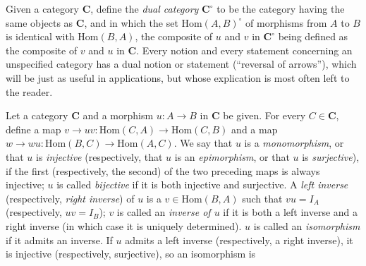 Given a category $\mathbf{C}$, define the \textit{dual category} $\mathbf{C}^{\circ}$ to be the
category having the same objects as $\mathbf{C}$, and in which the set
$\mathrm{Hom}(A,B)^{\circ}$ of morphisms from $A$ to $B$ is identical with
$\mathrm{Hom}(B,A)$, the composite of $u$ and $v$ in $\mathbf{C}^{\circ}$ being
defined as the composite of $v$ and $u$ in $\mathbf{C}$. Every notion and every
statement concerning an unspecified category has a dual notion or
statement (``reversal of arrows''), which will be just as useful in
applications, but whose explication is most often left to the reader.

Let a category $\mathbf{C}$ and a morphism $u:A\to B$ in $\mathbf{C}$ be given. For
every $C\in\mathbf{C}$, define a map
$v\to uv:\mathrm{Hom}(C,A)\to\mathrm{Hom}(C,B)$ and
a map
$w\to wu:\mathrm{Hom}(B,C)\to\mathrm{Hom}(A,C)$.
We say that $u$ is a \textit{monomorphism}, or that $u$ is \textit{injective}
(respectively, that $u$ is an \textit{epimorphism}, or that $u$ is
\textit{surjective}), if the first (respectively, the second) of the two
preceding maps is always injective; $u$ is called \textit{bijective} if it is
both injective and surjective.
A \textit{left inverse} (respectively, \textit{right inverse}) of $u$ is a
$v\in\mathrm{Hom}(B,A)$ such that $vu=I_A$ (respectively, $uv=I_B$); $v$ is
called an \textit{inverse of $u$} if it is both a left inverse and a right
inverse (in which case it is uniquely determined). $u$ is called an
\textit{isomorphism} if it admits an inverse. If $u$ admits a left inverse
(respectively, a right inverse), it is injective (respectively, surjective),
so an isomorphism is

